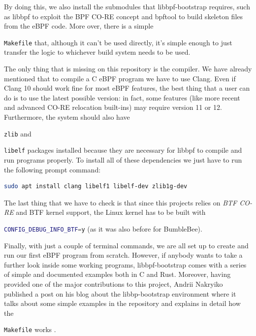 By doing this, we also install the submodules that libbpf-bootstrap requires, such as  libbpf to exploit the BPF CO-RE concept and bpftool to build skeleton files from the eBPF code.
More over, there is a simple \raggedright\colorbox{backcolour}{\lstinline[style=commandline, language=bash]|Makefile|} that, although it can't be used directly, it's simple enough to just transfer the logic to whichever build system needs to be used.

The only thing that is missing on this repository is the compiler.
We have already mentioned that to compile a C eBPF program we have to use Clang.
Even if Clang 10 should work fine for most eBPF features, the best thing that a user can do is to use the latest possible version: in fact, some features (like more recent and advanced CO-RE relocation built-ins) may require version 11 or 12.
Furthermore, the system should also have \raggedright\colorbox{backcolour}{\lstinline[style=commandline, language=bash]|zlib|} and \raggedright\colorbox{backcolour}{\lstinline[style=commandline, language=bash]|libelf|} packages installed because they are necessary for libbpf to compile and run programs properly.
To install all of these dependencies we just have to run the following prompt command:

\begin{lstlisting}[style=commandline, language=bash, caption={Install libbpf-bootstrap dependencies command.}]
	sudo apt install clang libelf1 libelf-dev zlib1g-dev
\end{lstlisting}

The last thing that we have to check is that since this projects relies on \textit{BTF CO-RE} and BTF kernel support, the  Linux kernel has to be built with \raggedright\colorbox{backcolour}{\lstinline[style=commandline, language=bash]|CONFIG_DEBUG_INFO_BTF=y|} (as it was also before for BumbleBee).

Finally, with just a couple of terminal commands, we are all set up to create and run our first eBPF program from scratch.
However, if anybody wants to take a further look inside some working programs, libbpf-bootstrap comes with a series of simple and documented examples both in C and Rust.
Moreover, having provided one of the major contributions to this project, Andrii Nakryiko published a post on his blog about the libbp-bootstrap environment where it talks about some simple examples in the repository and explains in detail how the \raggedright\colorbox{backcolour}{\lstinline[style=commandline, language=bash]|Makefile|} works \cite{ANlibbpfbootstrap}.

